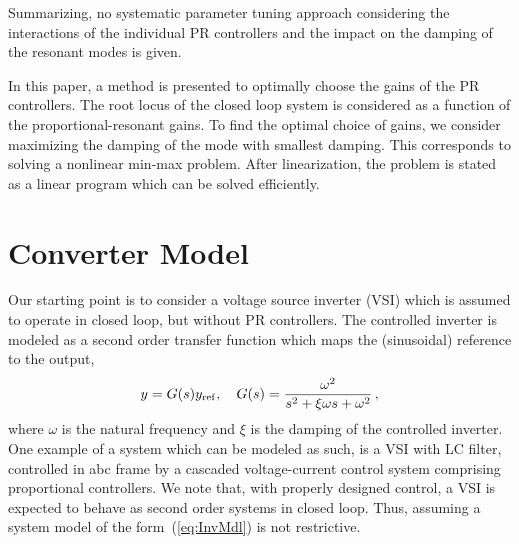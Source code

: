 \documentclass[conference,10pt]{IEEEtran}
\begin{document}
Summarizing, no systematic parameter tuning approach considering the interactions of the individual PR controllers and the impact on the damping of the resonant modes is given.

In this paper, a method is presented to optimally choose the gains of the PR controllers. The root locus of the closed loop system is considered as a function of the proportional-resonant gains. To find the optimal choice of gains, we consider maximizing the damping of the mode with smallest damping. This corresponds to solving a nonlinear min-max problem. After linearization, the problem is stated as a linear program which can be solved efficiently.






\section{Converter Model}

%

Our starting point is to consider a voltage source inverter (VSI) which is assumed to operate in closed loop, but without PR controllers.  The controlled inverter is modeled as a second order transfer function which maps the (sinusoidal) reference to the output,
\begin{align}
\label{eq:InvMdl}
y = G(s)y_{\rm ref},\quad G(s) = \frac{\omega^2}{s^2+\xi\omega s + \omega^2}\,,
\end{align}
where $\omega$ is the natural frequency and $\xi$ is the damping of the controlled inverter. One example of a system which can be modeled as such,
is a VSI with LC filter, %
controlled in abc frame by a cascaded voltage-current control system comprising proportional controllers.
We note that, with properly designed control, a VSI is expected to behave as second order systems in closed loop. Thus, assuming a system model of the form~(\ref{eq:InvMdl}) is not restrictive.

\end{document}
